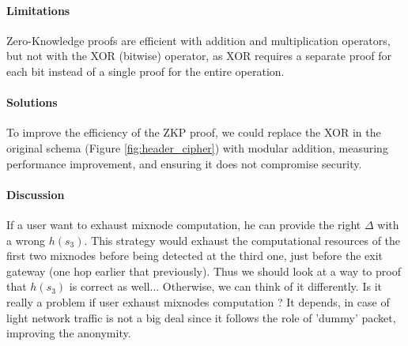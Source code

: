 \paragraph{Limitations} Zero-Knowledge proofs are efficient with addition and multiplication operators, but not with the XOR (bitwise) operator, as XOR requires a separate proof for each bit instead of a single proof for the entire operation.

\paragraph{Solutions} To improve the efficiency of the ZKP proof, we could replace the XOR in the original schema (Figure \ref{fig:header_cipher}) with modular addition, measuring performance improvement, and ensuring it does not compromise security.

\paragraph{Discussion} If a user want to exhaust mixnode computation, he can provide the right $\Delta$ with a wrong $h(s_3)$. 
This strategy would exhaust the computational resources of the first two mixnodes before being detected at the third one, just before the exit gateway (one hop earlier that previously).
Thus we should look at a way to proof that $h(s_3)$ is correct as well... %
Otherwise, we can think of it differently. 
Is it really a problem if user exhaust mixnodes computation ? 
It depends, in case of light network traffic is not a big deal since it follows the role of 'dummy' packet, improving the anonymity.
